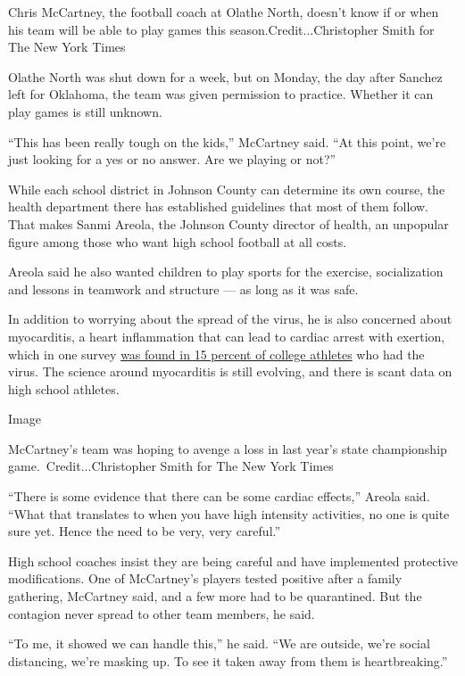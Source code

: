 Chris McCartney, the football coach at Olathe North, doesn't know if or
when his team will be able to play games this
season.Credit...Christopher Smith for The New York Times

Olathe North was shut down for a week, but on Monday, the day after
Sanchez left for Oklahoma, the team was given permission to practice.
Whether it can play games is still unknown.

``This has been really tough on the kids,'' McCartney said. ``At this
point, we're just looking for a yes or no answer. Are we playing or
not?''

While each school district in Johnson County can determine its own
course, the health department there has established guidelines that most
of them follow. That makes Sanmi Areola, the Johnson County director of
health, an unpopular figure among those who want high school football at
all costs.

Areola said he also wanted children to play sports for the exercise,
socialization and lessons in teamwork and structure --- as long as it
was safe.

In addition to worrying about the spread of the virus, he is also
concerned about myocarditis, a heart inflammation that can lead to
cardiac arrest with exertion, which in one survey
\href{https://www.nytimes3xbfgragh.onion/2020/08/23/sports/ncaafootball/college-football-myocarditis-coronavirus.html}{was
found in 15 percent of college athletes} who had the virus. The science
around myocarditis is still evolving, and there is scant data on high
school athletes.

Image

McCartney's team was hoping to avenge a loss in last year's state
championship game.~Credit...Christopher Smith for The New York Times

``There is some evidence that there can be some cardiac effects,''
Areola said. ``What that translates to when you have high intensity
activities, no one is quite sure yet. Hence the need to be very, very
careful.''

High school coaches insist they are being careful and have implemented
protective modifications. One of McCartney's players tested positive
after a family gathering, McCartney said, and a few more had to be
quarantined. But the contagion never spread to other team members, he
said.

``To me, it showed we can handle this,'' he said. ``We are outside,
we're social distancing, we're masking up. To see it taken away from
them is heartbreaking.''

